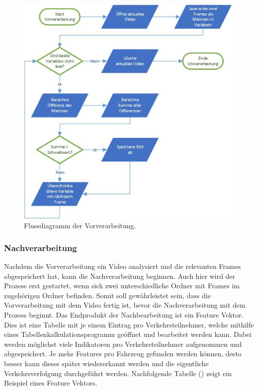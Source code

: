 \begin{figure}[H]
  \centering
  \includegraphics[width=0.99\textwidth]{Software/Fluss_Vorverarbeitung.jpg} 
  \caption{Flussdiagramm der Vorverarbeitung.}
  \label{bFlussVor}
\end{figure}

\newpage
\subsubsection{Nachverarbeitung}
Nachdem die Vorverarbeitung ein Video analysiert und die relevanten Frames abgespeichert hat, kann die Nachverarbeitung beginnen. Auch hier wird der Prozess erst gestartet, wenn sich zwei unterschiedliche Ordner mit Frames im zugehörigen Ordner befinden. Somit soll gewährleistet sein, dass die Vorverarbeitung mit dem Video fertig ist, bevor die Nachverarbeitung mit dem Prozess beginnt. Das Endprodukt der Nachbearbeitung ist ein Feature Vektor. Dies ist eine Tabelle mit je einem Eintrag pro Verkehrsteilnehmer, welche mithilfe eines Tabellenkalkulationsprogramm geöffnet und bearbeitet werden kann. Dabei werden möglichst viele Indikatoren pro Verkehrsteilnehmer aufgenommen und abgespeichert. Je mehr Features pro Fahrzeug gefunden werden können, desto besser kann dieses später wiedererkannt werden und die eigentliche Verkehrsverfolgung durchgeführt werden. Nachfolgende Tabelle () zeigt ein Beispiel eines Feature Vektors.

